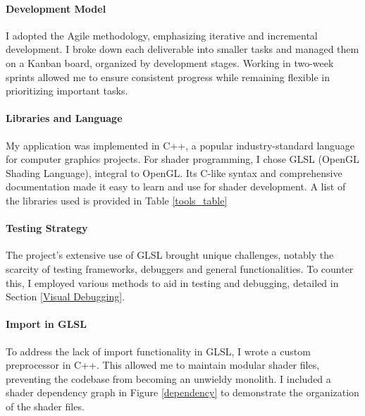 \paragraph{Development Model}
I adopted the Agile methodology, emphasizing iterative and incremental development. I broke down each deliverable into smaller tasks and managed them on a Kanban board, organized by development stages. Working in two-week sprints allowed me to ensure consistent progress while remaining flexible in prioritizing important tasks.


\paragraph{Libraries and Language}
My application was implemented in C++, a popular industry-standard language for computer graphics projects. For shader programming, I chose GLSL (OpenGL Shading Language), integral to OpenGL. Its C-like syntax and comprehensive documentation made it easy to learn and use for shader development. A list of the libraries used is provided in Table \ref{tools_table}


\paragraph{Testing Strategy}
The project's extensive use of GLSL brought unique challenges, notably the scarcity of testing frameworks, debuggers and general functionalities. To counter this, I employed various methods to aid in testing and debugging, detailed in Section \ref{Visual Debugging}.

\paragraph{Import in GLSL}
To address the lack of import functionality in GLSL, I wrote a custom preprocessor in C++. This allowed me to maintain modular shader files, preventing the codebase from becoming an unwieldy monolith. I included a shader dependency graph in Figure \ref{dependency} to demonstrate the organization of the shader files.


